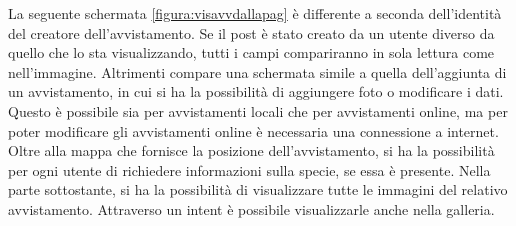 \documentclass[a4paper,final,12pt]{report}
\begin{document}
La seguente schermata \ref{figura:visavvdallapag} è differente a seconda dell'identità del creatore dell'avvistamento. Se il post è stato creato da un utente diverso da quello che lo sta visualizzando, tutti i campi compariranno in sola lettura come nell'immagine. Altrimenti compare una schermata simile a quella dell'aggiunta di un avvistamento, in cui si ha la possibilità di aggiungere foto o modificare i dati. Questo è possibile sia per avvistamenti locali che per avvistamenti online, ma per poter modificare gli avvistamenti online è necessaria una connessione a internet. Oltre alla mappa che fornisce la posizione dell'avvistamento, si ha la possibilità per ogni utente di richiedere informazioni sulla specie, se essa è presente. Nella parte sottostante, si ha la possibilità di visualizzare tutte le immagini del relativo avvistamento. Attraverso un intent è possibile visualizzarle anche nella galleria.
\end{document}
